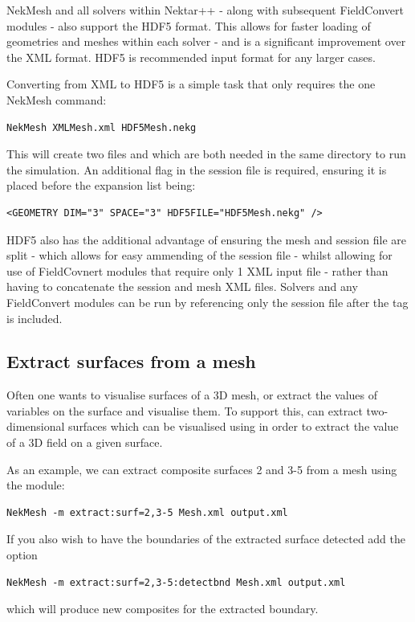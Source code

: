 NekMesh and all solvers within Nektar++ - along with subsequent FieldConvert modules - also support the HDF5 format. This allows for faster loading of geometries and meshes within each solver - and is a significant improvement over the XML format. HDF5 is recommended input format for any larger cases.

Converting from XML to HDF5 is a simple task that only requires the one NekMesh command:
\begin{lstlisting}[style=BashInputStyle]
    NekMesh XMLMesh.xml HDF5Mesh.nekg
\end{lstlisting}

This will create two files  and  which are both needed in the same directory to run the simulation. An additional flag in the session file is required, ensuring it is placed before the expansion list being:

\begin{lstlisting}[style=XmlStyle]
    <GEOMETRY DIM="3" SPACE="3" HDF5FILE="HDF5Mesh.nekg" />
\end{lstlisting}

HDF5 also has the additional advantage of ensuring the mesh and session file are split - which allows for easy ammending of the session file - whilst allowing for use of FieldCovnert modules that require only 1 XML input file - rather than having to concatenate the session and mesh XML files. Solvers and any FieldConvert modules can be run by referencing only the session file after the  tag is included. 

\subsection{Extract surfaces from a mesh}
\label{s:utilities:nekmesh:extract}

Often one wants to visualise surfaces of a 3D mesh, or extract the values of
variables on the surface and visualise them. To support this, \nm can extract
two-dimensional surfaces which can be visualised using  in
order to extract the value of a 3D field on a given surface.

As an example, we can extract composite surfaces 2 and 3-5 from a mesh using the
 module:
%
\begin{lstlisting}[style=BashInputStyle]
NekMesh -m extract:surf=2,3-5 Mesh.xml output.xml
\end{lstlisting}
%
If you also wish to have the boundaries of the extracted surface detected add
the  option
%
\begin{lstlisting}[style=BashInputStyle]
NekMesh -m extract:surf=2,3-5:detectbnd Mesh.xml output.xml
\end{lstlisting}
which will produce new composites for the extracted boundary.

